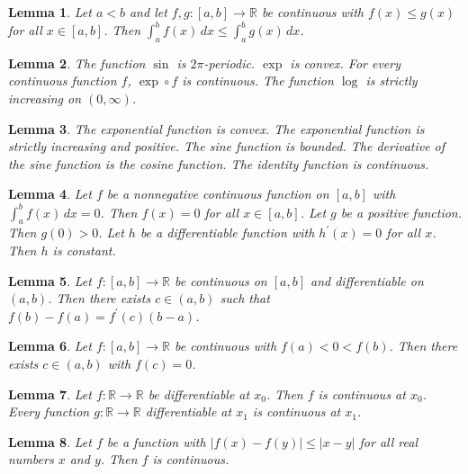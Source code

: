 \documentclass{article}
\newtheorem{lemma}{Lemma}
\begin{document}
\begin{lemma}\label{two-signatures-with}
Let $a<b$ and let $f,g\colon[a,b]\to\mathbb{R}$ be continuous with $f(x)\le g(x)$ for all $x\in[a,b]$. Then $\int_a^b f(x)\,dx\le\int_a^b g(x)\,dx$.
\end{lemma}

\begin{lemma}\label{standard-functions}
The function $\sin$ is $2\pi$-periodic. $\exp$ is convex. For every continuous function $f$, $\exp\circ f$ is continuous. The function $\log$ is strictly increasing on $(0,\infty)$.
\end{lemma}

\begin{lemma}\label{named-functions}
The exponential function is convex. The exponential function is strictly increasing and positive. The sine function is bounded. The derivative of the sine function is the cosine function. The identity function is continuous.
\end{lemma}

\begin{lemma}\label{values-of-functions}
Let $f$ be a nonnegative continuous function on $[a,b]$ with $\int_a^b f(x)\,dx=0$. Then $f(x)=0$ for all $x\in[a,b]$. Let $g$ be a positive function. Then $g(0)>0$. Let $h$ be a differentiable function with $h^\prime(x)=0$ for all $x$. Then $h$ is constant.
\end{lemma}

\begin{lemma}\label{mean-value-prime}
Let $f\colon[a,b]\to\mathbb{R}$ be continuous on $[a,b]$ and differentiable on $(a,b)$. Then there exists $c\in(a,b)$ such that $f(b)-f(a)=f^\prime(c)(b-a)$.
\end{lemma}

\begin{lemma}\label{interval-ends}
Let $f\colon[a,b]\to\mathbb{R}$ be continuous with $f(a)<0<f(b)$. Then there exists $c\in(a,b)$ with $f(c)=0$.
\end{lemma}

\begin{lemma}\label{point-letter}
Let $f\colon\mathbb{R}\to\mathbb{R}$ be differentiable at $x_0$. Then $f$ is continuous at $x_0$. Every function $g\colon\mathbb{R}\to\mathbb{R}$ differentiable at $x_1$ is continuous at $x_1$.
\end{lemma}

\begin{lemma}\label{two-names-condition}
Let $f$ be a function with $|f(x)-f(y)|\le|x-y|$ for all real numbers $x$ and $y$. Then $f$ is continuous.
\end{lemma}
\end{document}
